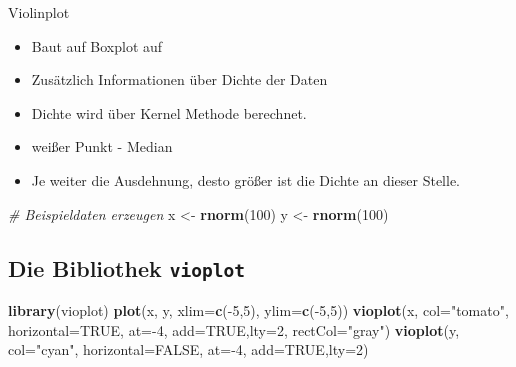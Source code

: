 \documentclass[]{article}
\newenvironment{Shaded}{\begin{snugshade}}{\end{snugshade}}
\newcommand{\KeywordTok}[1]{\textcolor[rgb]{0.13,0.29,0.53}{\textbf{{#1}}}}
\newcommand{\DataTypeTok}[1]{\textcolor[rgb]{0.13,0.29,0.53}{{#1}}}
\newcommand{\DecValTok}[1]{\textcolor[rgb]{0.00,0.00,0.81}{{#1}}}
\newcommand{\StringTok}[1]{\textcolor[rgb]{0.31,0.60,0.02}{{#1}}}
\newcommand{\CommentTok}[1]{\textcolor[rgb]{0.56,0.35,0.01}{\textit{{#1}}}}
\newcommand{\OtherTok}[1]{\textcolor[rgb]{0.56,0.35,0.01}{{#1}}}
\newcommand{\NormalTok}[1]{{#1}}
\providecommand{\tightlist}{%
  \setlength{\itemsep}{0pt}\setlength{\parskip}{0pt}}
\begin{document}
Violinplot

\begin{itemize}
\tightlist
\item
  Baut auf Boxplot auf
\item
  Zusätzlich Informationen über Dichte der Daten
\item
  Dichte wird über Kernel Methode berechnet.
\item
  weißer Punkt - Median
\item
  Je weiter die Ausdehnung, desto größer ist die Dichte an dieser
  Stelle.
\end{itemize}

\begin{Shaded}
\begin{Highlighting}[]
\CommentTok{# Beispieldaten erzeugen}
\NormalTok{x <-}\StringTok{ }\KeywordTok{rnorm}\NormalTok{(}\DecValTok{100}\NormalTok{)}
\NormalTok{y <-}\StringTok{ }\KeywordTok{rnorm}\NormalTok{(}\DecValTok{100}\NormalTok{)}
\end{Highlighting}
\end{Shaded}

\subsection{\texorpdfstring{Die Bibliothek
\texttt{vioplot}}{Die Bibliothek vioplot}}\label{die-bibliothek-vioplot}

\begin{Shaded}
\begin{Highlighting}[]
\KeywordTok{library}\NormalTok{(vioplot)}
\KeywordTok{plot}\NormalTok{(x, y, }\DataTypeTok{xlim=}\KeywordTok{c}\NormalTok{(-}\DecValTok{5}\NormalTok{,}\DecValTok{5}\NormalTok{), }\DataTypeTok{ylim=}\KeywordTok{c}\NormalTok{(-}\DecValTok{5}\NormalTok{,}\DecValTok{5}\NormalTok{))}
\KeywordTok{vioplot}\NormalTok{(x, }\DataTypeTok{col=}\StringTok{"tomato"}\NormalTok{, }\DataTypeTok{horizontal=}\OtherTok{TRUE}\NormalTok{, }\DataTypeTok{at=}\NormalTok{-}\DecValTok{4}\NormalTok{, }
        \DataTypeTok{add=}\OtherTok{TRUE}\NormalTok{,}\DataTypeTok{lty=}\DecValTok{2}\NormalTok{, }\DataTypeTok{rectCol=}\StringTok{"gray"}\NormalTok{)}
\KeywordTok{vioplot}\NormalTok{(y, }\DataTypeTok{col=}\StringTok{"cyan"}\NormalTok{, }\DataTypeTok{horizontal=}\OtherTok{FALSE}\NormalTok{, }\DataTypeTok{at=}\NormalTok{-}\DecValTok{4}\NormalTok{, }
        \DataTypeTok{add=}\OtherTok{TRUE}\NormalTok{,}\DataTypeTok{lty=}\DecValTok{2}\NormalTok{)}
\end{Highlighting}
\end{Shaded}
\end{document}
